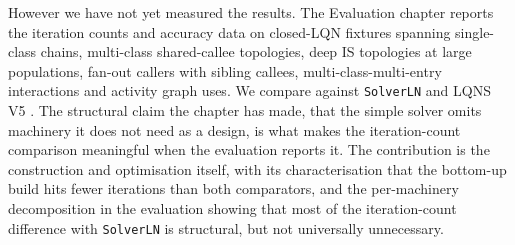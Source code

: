 However we have not yet measured the results. The Evaluation chapter reports the iteration counts and accuracy data on closed-LQN fixtures spanning single-class chains, multi-class shared-callee topologies, deep IS topologies at large populations, fan-out callers with sibling callees, multi-class-multi-entry interactions and activity graph uses. We compare against \texttt{SolverLN} \cite{casale2024} and LQNS V5 \cite{franks2009,franks2022manual}. The structural claim the chapter has made, that the simple solver omits machinery it does not need as a design, is what makes the iteration-count comparison meaningful when the evaluation reports it. The contribution is the construction and optimisation itself, with its characterisation that the bottom-up build hits fewer iterations than both comparators, and the per-machinery decomposition in the evaluation showing that most of the iteration-count difference with \texttt{SolverLN} is structural, but not universally unnecessary.



